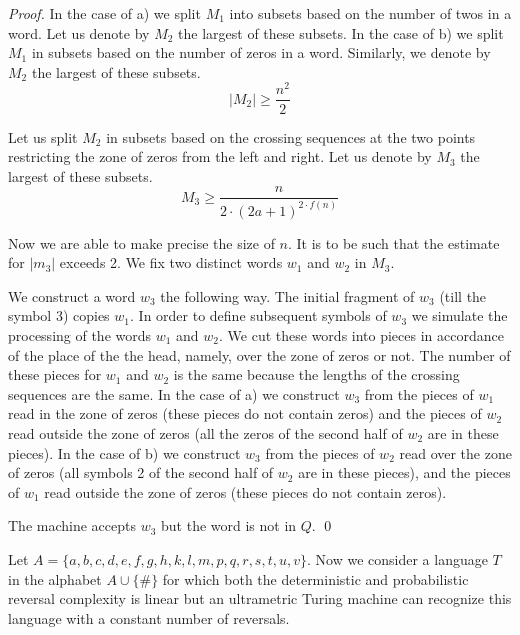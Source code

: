 \documentclass{llncs}
\begin{document}
\begin{proof}
In the case of a) we split $M_1$ into subsets based on the number of twos in a word. Let us denote by $M_2$ the largest of these subsets. In the case of b) we split $M_1$ in subsets based on the number of zeros in a word. Similarly, we denote by $M_2$ the largest of these subsets. $$|M_2|\geq \frac{n^2}{2}$$

Let us split $M_2$ in subsets based on the crossing sequences at the two points restricting the zone of zeros from the left and right. Let us denote by $M_3$ the largest of these subsets. $$M_3 \geq \frac{n}{2\cdot (2a+1)^{2\cdot f(n)}}$$

Now we are able to make precise the size of $n$. It is to be such that the estimate for $|m_3|$ exceeds 2. We fix two distinct words $w_1$ and $w_2$ in $M_3$.

We construct a word $w_3$ the following way. The initial fragment of $w_3$ (till the symbol 3) copies $w_1$. In order to define subsequent symbols of $w_3$ we simulate the processing of the words $w_1$ and $w_2$. We cut these words into pieces in accordance of the place of the the head, namely, over the zone of zeros or not. The number of these pieces for $w_1$ and $w_2$ is the same because the lengths of the crossing sequences are the same. In the case of a) we construct $w_3$ from the pieces of $w_1$ read in the zone of zeros (these pieces do not contain zeros) and the pieces of $w_2$ read outside   the zone of zeros (all the zeros of the second half of $w_2$ are in these pieces). In the case of b) we construct $w_3$ from the pieces of $w_2$ read over the zone of zeros (all symbols 2 of the second half of $w_2$ are in these pieces), and the pieces of $w_1$ read outside the zone of zeros (these pieces do not contain zeros). 

The machine accepts $w_3$ but the word is not in $Q$. 
\qed

\end{proof}

\bigskip










Let $A = \{a,b,c,d,e,f,g,h,k,l,m,p,q,r,s,t,u,v\}$.
Now we consider a language $T$ in the alphabet $A \cup \{\#\} $ for which both the deterministic and probabilistic reversal complexity is linear but an ultrametric Turing machine can recognize this language with a constant number of reversals.
\end{document}
